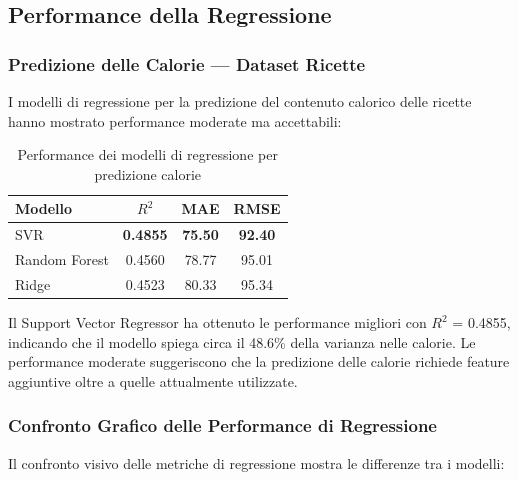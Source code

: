 \documentclass[12pt,a4paper]{article}
\begin{document}
\subsection{Performance della Regressione}

\subsubsection{Predizione delle Calorie --- Dataset Ricette}

I modelli di regressione per la predizione del contenuto calorico delle ricette hanno mostrato performance moderate ma accettabili:

\begin{table}[H]
\centering
\begin{tabular}{@{}lccc@{}}
\toprule
\textbf{Modello} & \textbf{$R^2$} & \textbf{MAE} & \textbf{RMSE} \\
\midrule
SVR & \textbf{0.4855} & \textbf{75.50} & \textbf{92.40} \\
Random Forest & 0.4560 & 78.77 & 95.01 \\
Ridge & 0.4523 & 80.33 & 95.34 \\
\bottomrule
\end{tabular}
\caption{Performance dei modelli di regressione per predizione calorie}
\label{tab:regression_results}
\end{table}

Il Support Vector Regressor ha ottenuto le performance migliori con $R^2$ = 0.4855, indicando che il modello spiega circa il 48.6\% della varianza nelle calorie. Le performance moderate suggeriscono che la predizione delle calorie richiede feature aggiuntive oltre a quelle attualmente utilizzate.

\subsubsection{Confronto Grafico delle Performance di Regressione}

Il confronto visivo delle metriche di regressione mostra le differenze tra i modelli:
\end{document}
